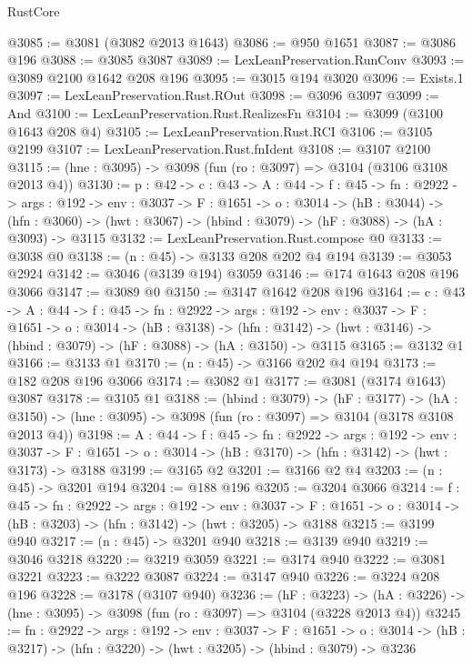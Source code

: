 \begin{lexlean}{RustCore}
\begin{coremodule}
@3085 := @3081 (@3082 @2013 @1643)
@3086 := @950 @1651
@3087 := @3086 @196
@3088 := @3085 @3087
@3089 := LexLeanPreservation.RunConv
@3093 := @3089 @2100 @1642 @208 @196
@3095 := @3015 @194 @3020
@3096 := Exists.{1}
@3097 := LexLeanPreservation.Rust.ROut
@3098 := @3096 @3097
@3099 := And
@3100 := LexLeanPreservation.Rust.RealizesFn
@3104 := @3099 (@3100 @1643 @208 @4)
@3105 := LexLeanPreservation.Rust.RCI
@3106 := @3105 @2199
@3107 := LexLeanPreservation.Rust.fnIdent
@3108 := @3107 @2100
@3115 := (hne : @3095) -> @3098 (fun (ro : @3097) => @3104 (@3106 @3108 @2013 @4))
@3130 := {p : @42} ->
  {c : @43} ->
  {A : @44} ->
  {f : @45} ->
  {fn : @2922} ->
  {args : @192} ->
  {env : @3037} ->
  {F : @1651} ->
  {o : @3014} ->
  (hB : @3044) ->
  (hfn : @3060) -> (hwt : @3067) -> (hbind : @3079) -> (hF : @3088) -> (hA : @3093) -> @3115
@3132 := LexLeanPreservation.Rust.compose @0
@3133 := @3038 @0
@3138 := (n : @45) -> @3133 @208 @202 @4 @194
@3139 := @3053 @2924
@3142 := @3046 (@3139 @194) @3059
@3146 := @174 @1643 @208 @196 @3066
@3147 := @3089 @0
@3150 := @3147 @1642 @208 @196
@3164 := {c : @43} ->
  {A : @44} ->
  {f : @45} ->
  {fn : @2922} ->
  {args : @192} ->
  {env : @3037} ->
  {F : @1651} ->
  {o : @3014} ->
  (hB : @3138) ->
  (hfn : @3142) -> (hwt : @3146) -> (hbind : @3079) -> (hF : @3088) -> (hA : @3150) -> @3115
@3165 := @3132 @1
@3166 := @3133 @1
@3170 := (n : @45) -> @3166 @202 @4 @194
@3173 := @182 @208 @196 @3066
@3174 := @3082 @1
@3177 := @3081 (@3174 @1643) @3087
@3178 := @3105 @1
@3188 := (hbind : @3079) ->
  (hF : @3177) ->
  (hA : @3150) -> (hne : @3095) -> @3098 (fun (ro : @3097) => @3104 (@3178 @3108 @2013 @4))
@3198 := {A : @44} ->
  {f : @45} ->
  {fn : @2922} ->
  {args : @192} ->
  {env : @3037} ->
  {F : @1651} -> {o : @3014} -> (hB : @3170) -> (hfn : @3142) -> (hwt : @3173) -> @3188
@3199 := @3165 @2
@3201 := @3166 @2 @4
@3203 := (n : @45) -> @3201 @194
@3204 := @188 @196
@3205 := @3204 @3066
@3214 := {f : @45} ->
  {fn : @2922} ->
  {args : @192} ->
  {env : @3037} ->
  {F : @1651} -> {o : @3014} -> (hB : @3203) -> (hfn : @3142) -> (hwt : @3205) -> @3188
@3215 := @3199 @940
@3217 := (n : @45) -> @3201 @940
@3218 := @3139 @940
@3219 := @3046 @3218
@3220 := @3219 @3059
@3221 := @3174 @940
@3222 := @3081 @3221
@3223 := @3222 @3087
@3224 := @3147 @940
@3226 := @3224 @208 @196
@3228 := @3178 (@3107 @940)
@3236 := (hF : @3223) ->
  (hA : @3226) -> (hne : @3095) -> @3098 (fun (ro : @3097) => @3104 (@3228 @2013 @4))
@3245 := {fn : @2922} ->
  {args : @192} ->
  {env : @3037} ->
  {F : @1651} ->
  {o : @3014} -> (hB : @3217) -> (hfn : @3220) -> (hwt : @3205) -> (hbind : @3079) -> @3236

\end{coremodule}
\end{lexlean}
